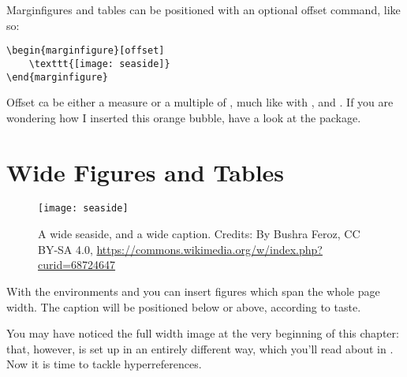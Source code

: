 Marginfigures and tables can be positioned with an optional offset 
command, like so:

\begin{lstlisting}
\begin{marginfigure}[offset]
	\texttt{[image: seaside]}
\end{marginfigure}
\end{lstlisting}

Offset ca be either a measure or a multiple of , 
much like with ,  and 
. If you are wondering how I 
inserted this orange bubble, have a look at the  package.

\section{Wide Figures and Tables}

\begin{figure*}[h!]
	\texttt{[image: seaside]}
	\caption[A wide seaside]{A wide seaside, and a wide caption.
		Credits: By Bushra Feroz, CC BY-SA 4.0, \url{https://commons.wikimedia.org/w/index.php?curid=68724647}}
\end{figure*}

With the environments  and  you 
can insert figures which span the whole page width. The caption will be 
positioned below or above, according to taste.

You may have noticed the full width image at the very beginning of this 
chapter: that, however, is set up in an entirely different way, which 
you'll read about in . Now it is time to tackle 
hyperreferences.
